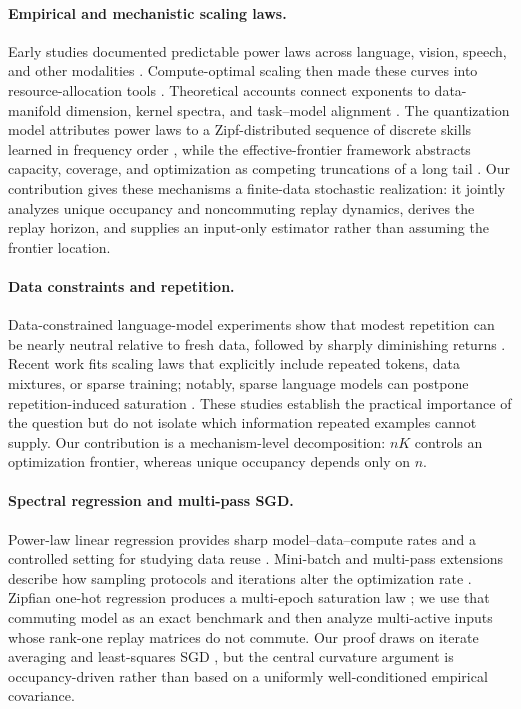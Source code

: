 \documentclass[letterpaper]{article}
\begin{document}
\paragraph{Empirical and mechanistic scaling laws.}
Early studies documented predictable power laws across language, vision,
speech, and other modalities \cite{hestness2017scaling,kaplan2020scaling,
rosenfeld2020constructive}. Compute-optimal scaling then made these curves into
resource-allocation tools \cite{hoffmann2022training}. Theoretical accounts
connect exponents to data-manifold dimension, kernel spectra, and task--model
alignment \cite{sharma2022manifold,bordelon2020spectrum,canatar2021spectral,
bahri2024explaining}. The quantization model attributes power laws to a
Zipf-distributed sequence of discrete skills learned in frequency order
\cite{michaud2023quantization}, while the effective-frontier framework abstracts
capacity, coverage, and optimization as competing truncations of a long tail
\cite{zou2026frontiers}. Our contribution gives these mechanisms a finite-data
stochastic realization: it jointly analyzes unique occupancy and noncommuting
replay dynamics, derives the replay horizon, and supplies an input-only
estimator rather than assuming the frontier location.

\paragraph{Data constraints and repetition.}
Data-constrained language-model experiments show that modest repetition can be
nearly neutral relative to fresh data, followed by sharply diminishing returns
\cite{muennighoff2025scaling}. Recent work fits scaling laws that explicitly
include repeated tokens, data mixtures, or sparse training; notably, sparse
language models can postpone repetition-induced saturation
\cite{wu2026scarce}. These studies establish the practical importance of the
question but do not isolate which information repeated examples cannot supply.
Our contribution is a mechanism-level decomposition: $nK$ controls an
optimization frontier, whereas unique occupancy depends only on $n$.

\paragraph{Spectral regression and multi-pass SGD.}
Power-law linear regression provides sharp model--data--compute rates and a
controlled setting for studying data reuse \cite{lin2024scaling,lin2025reuse}.
Mini-batch and multi-pass extensions describe how sampling protocols and
iterations alter the optimization rate \cite{chen2026minibatch,
zou2022multipass}. Zipfian one-hot regression produces a multi-epoch saturation
law \cite{yan2026larger}; we use that commuting model as an exact benchmark and
then analyze multi-active inputs whose rank-one replay matrices do not commute.
Our proof draws on iterate averaging and least-squares SGD
\cite{polyak1992acceleration,bach2013non,defossez2015averaged,
dieuleveut2016nonparametric,neu2018averaging,ali2020implicit}, but the central
curvature argument is occupancy-driven rather than based on a uniformly
well-conditioned empirical covariance.
\end{document}
